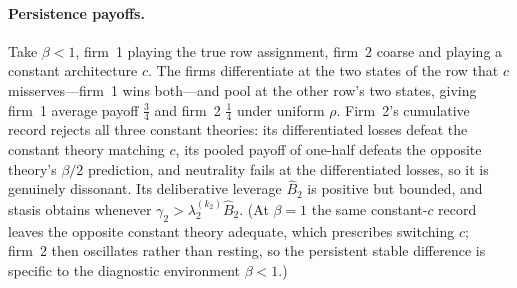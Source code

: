 \documentclass[11pt]{article}
\theoremstyle{definition}
\begin{document}
\paragraph{Persistence payoffs.}
Take $\beta<1$, firm~1 playing the true row assignment, firm~2 coarse and playing a constant architecture $c$.
The firms differentiate at the two states of the row that $c$ misserves---firm~1 wins both---and pool at the other row's two states, giving firm~1 average payoff $\tfrac34$ and firm~2 $\tfrac14$ under uniform $\rho$.
Firm~2's cumulative record rejects all three constant theories: its differentiated losses defeat the constant theory matching $c$, its pooled payoff of one-half defeats the opposite theory's $\beta/2$ prediction, and neutrality fails at the differentiated losses, so it is genuinely dissonant.
Its deliberative leverage $\widehat B_2$ is positive but bounded, and stasis obtains whenever $\gamma_2>\lambda_2^{(k_2)}\widehat B_2$.
(At $\beta=1$ the same constant-$c$ record leaves the opposite constant theory adequate, which prescribes switching $c$; firm~2 then oscillates rather than resting, so the persistent stable difference is specific to the diagnostic environment $\beta<1$.)
\end{document}
